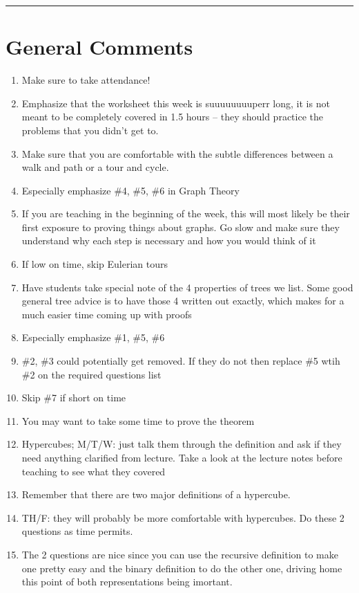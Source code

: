 \documentclass{exam}
\title{}
\date{Graphs, Trees, Hypercubes}
\begin{document}
\maketitle
\rule{\textwidth}{0.15em}
\fontsize{12}{15}\selectfont
\thispagestyle{empty}


\section{General Comments}
\begin{enumerate}
\item Make sure to take attendance!
\item Emphasize that the worksheet this week is suuuuuuuuperr long, it is not meant to be completely covered in 1.5 hours -- they should practice the problems that you didn’t get to.
\item Make sure that you are comfortable with the subtle differences between a walk and path or a tour and cycle. 
\item Especially emphasize \#4, \#5, \#6 in Graph Theory
\item If you are teaching in the beginning of the week, this will most likely be their first exposure to proving things about graphs. Go slow and make sure they understand why each step is necessary and how you would think of it
\item If low on time, skip Eulerian tours
\item Have students take special note of the 4 properties of trees we list. Some good general tree advice is to have those 4 written out exactly, which makes for a much easier time coming up with proofs
\item Especially emphasize \#1, \#5, \#6 
\item \#2, \#3 could potentially get removed. If they do not then replace \#5 wtih \#2 on the required questions list
\item Skip \#7 if short on time
\item You may want to take some time to prove the theorem
\item Hypercubes; M/T/W: just talk them through the definition and ask if they need anything clarified from lecture. Take a look at the lecture notes before teaching to see what they covered
\item Remember that there are two major definitions of a hypercube. 
\item TH/F: they will probably be more comfortable with hypercubes. Do these 2 questions as time permits.
\item The 2 questions are nice since you can use the recursive definition to make one pretty easy and the binary definition to do the other one, driving home this point of both representations being imortant.
\end{enumerate}
\end{document}
